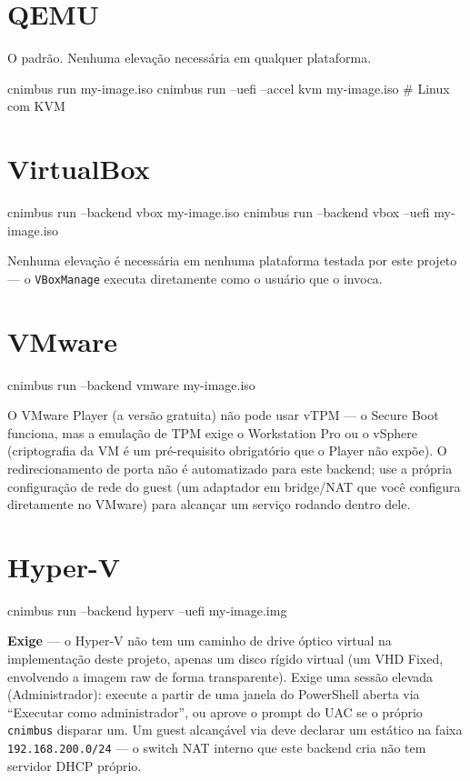 \documentclass[11pt,letterpaper]{report}
\newcommand{\dashfix}[1]{\StrSubstitute{#1}{--}{-{}-}}
\newcommand{\flag}[1]{\texttt{\textbf{\dashfix{#1}}}}
\newcommand{\dir}[1]{\texttt{\textbf{\dashfix{#1}}}}
\begin{document}
\section{QEMU}

O padrão. Nenhuma elevação necessária em qualquer plataforma.

\begin{shell}
cnimbus run my-image.iso
cnimbus run --uefi --accel kvm my-image.iso   # Linux com KVM
\end{shell}

\section{VirtualBox}

\begin{shell}
cnimbus run --backend vbox my-image.iso
cnimbus run --backend vbox --uefi my-image.iso
\end{shell}

Nenhuma elevação é necessária em nenhuma plataforma testada por este
projeto --- o \texttt{VBoxManage} executa diretamente como o usuário
que o invoca.

\section{VMware}

\begin{shell}
cnimbus run --backend vmware my-image.iso
\end{shell}

O VMware Player (a versão gratuita) não pode usar vTPM --- o Secure
Boot funciona, mas a emulação de TPM exige o Workstation Pro ou o
vSphere (criptografia da VM é um pré-requisito obrigatório que o
Player não expõe). O redirecionamento de porta não é automatizado
para este backend; use a própria configuração de rede do guest (um
adaptador em bridge/NAT que você configura diretamente no VMware) para
alcançar um serviço rodando dentro dele.

\section{Hyper-V}

\begin{shell}
cnimbus run --backend hyperv --uefi my-image.img
\end{shell}

\textbf{Exige \flag{FORMAT raw}} --- o Hyper-V não tem um caminho de
drive óptico virtual na implementação deste projeto, apenas um disco
rígido virtual (um VHD Fixed, envolvendo a imagem raw de forma
transparente). Exige uma sessão elevada (Administrador): execute a
partir de uma janela do PowerShell aberta via ``Executar como
administrador'', ou aprove o prompt do UAC se o próprio
\texttt{cnimbus} disparar um. Um guest alcançável via \flag{--hostfwd}
deve declarar um \dir{IP} estático na faixa \texttt{192.168.200.0/24}
--- o switch NAT interno que este backend cria não tem servidor DHCP
próprio.
\end{document}
